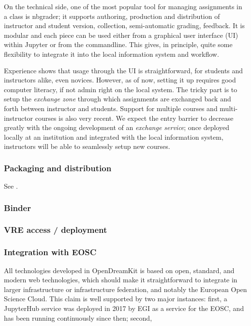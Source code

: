 \documentclass{deliverablereport}
\begin{document}
On the technical side, one of the most popular tool for managing
assignments in a class is nbgrader; it supports authoring,
production and distribution of instructor and student version,
collection, semi-automatic grading, feedback. It is modular and each
piece can be used either from a graphical user interface (UI) within
Jupyter or from the commandline. This gives, in principle, quite some
flexibility to integrate it into the local information system and
workflow.

Experience shows that usage through the UI is straightforward, for
students and instructors alike, even novices. However, as of now,
setting it up requires good computer literacy, if not admin right on the
local system. The tricky part is to setup the \emph{exchange zone}
through which assignments are exchanged back and forth between
instructor and students. Support for multiple courses and
multi-instructor courses is also very recent. We expect the entry
barrier to decrease greatly with the ongoing development of an
\emph{exchange service}; once deployed locally at an institution and
integrated with the local information system, instructors will be able
to seamlessly setup new courses.

\subsubsection{Packaging and distribution}

See .

\subsubsection{Binder}

\subsubsection{VRE access / deployment}

\subsubsection{Integration with EOSC}

All technologies developed in OpenDreamKit is based on open, standard,
and modern web technologies, which should make it straightforward to
integrate in larger infrastructure or infrastructure federation, and
notably the European Open Science Cloud. This claim is well supported
by two major instances: first, a JupyterHub service was deployed in
2017 by EGI as a service for the EOSC, and has been running
continuously since then; second, 
\end{document}
